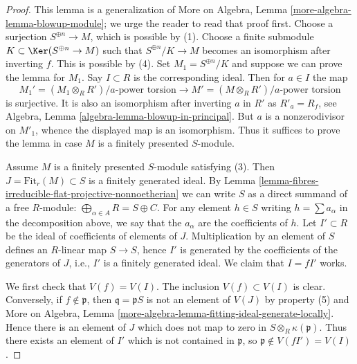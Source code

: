 \begin{proof}
This lemma is a generalization of
More on Algebra, Lemma \ref{more-algebra-lemma-blowup-module};
we urge the reader to read that proof first.
Choose a surjection $S^{\oplus n} \to M$, which is possible by (1).
Choose a finite submodule $K \subset \Ker(S^{\oplus n} \to M)$
such that $S^{\oplus n}/K \to M$ becomes an isomorphism after inverting $f$.
This is possible by (4). Set $M_1 = S^{\oplus n}/K$ and suppose we can
prove the lemma for $M_1$. Say $I \subset R$ is the corresponding ideal.
Then for $a \in I$ the map
$$
M_1' = (M_1 \otimes_R R')/a\text{-power torsion}
\longrightarrow
M' = (M \otimes_R R')/a\text{-power torsion}
$$
is surjective. It is also an isomorphism after inverting $a$ in $R'$
as $R'_a = R_f$, see Algebra, Lemma \ref{algebra-lemma-blowup-in-principal}.
But $a$ is a nonzerodivisor on $M'_1$, whence the displayed map is an
isomorphism. Thus it suffices to prove the lemma in case $M$ is a finitely
presented $S$-module.

\medskip\noindent
Assume $M$ is a finitely presented $S$-module satisfying (3).
Then $J = \text{Fit}_r(M) \subset S$ is a finitely generated ideal.
By Lemma \ref{lemma-fibres-irreducible-flat-projective-nonnoetherian}
we can write $S$ as a direct summand of a free
$R$-module: $\bigoplus_{\alpha \in A} R = S \oplus C$.
For any element $h \in S$ writing $h = \sum a_\alpha$ in the
decomposition above, we say that the $a_\alpha$ are the coefficients of $h$.
Let $I' \subset R$ be the ideal of coefficients
of elements of $J$. Multiplication by an element of $S$ defines
an $R$-linear map $S \to S$, hence $I'$ is generated by the coefficients
of the generators of $J$, i.e., $I'$ is a finitely generated ideal.
We claim that $I = fI'$ works.

\medskip\noindent
We first check that $V(f) = V(I)$. The inclusion $V(f) \subset V(I)$ is
clear. Conversely, if $f \not \in \mathfrak p$, then
$\mathfrak q =  \mathfrak p S$ is not an element of $V(J)$ by
property (5) and More on Algebra, Lemma
\ref{more-algebra-lemma-fitting-ideal-generate-locally}.
Hence there is an
element of $J$ which does not map to zero in $S \otimes_R \kappa(\mathfrak p)$.
Thus there exists an element of $I'$ which is not contained in
$\mathfrak p$, so $\mathfrak p \not \in V(fI') = V(I)$.


\end{proof}
